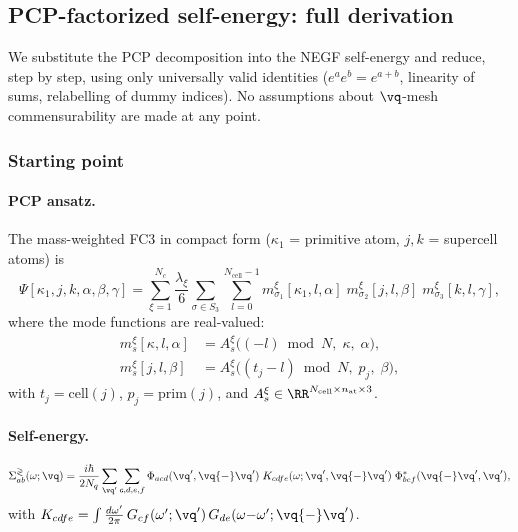 \subsection{PCP-factorized self-energy: full derivation}
\label{sub:pcp_derivation}

We substitute the PCP decomposition into the NEGF self-energy and
reduce, step by step, using only universally valid identities
($e^a e^b = e^{a+b}$, linearity of sums, relabelling of dummy
indices).  No assumptions about $\vq$-mesh commensurability are
made at any point.


\subsubsection{Starting point}

\paragraph{PCP ansatz.}
The mass-weighted FC3 in compact form
($\kappa_1$ = primitive atom, $j,k$ = supercell atoms) is
\begin{equation}\label{eq:pcp_raw}
  \Psi[\kappa_1, j, k, \alpha, \beta, \gamma]
  = \sum_{\xi=1}^{N_c} \frac{\lambda_\xi}{6}
    \sum_{\sigma \in S_3} \sum_{l=0}^{N_\mathrm{cell}-1}
    m_{\sigma_1}^{\xi}[\kappa_1, l, \alpha]\;
    m_{\sigma_2}^{\xi}[j, l, \beta]\;
    m_{\sigma_3}^{\xi}[k, l, \gamma],
\end{equation}
where the mode functions are real-valued:
\begin{align}
  m_s^{\xi}[\kappa, l, \alpha]
    &= A_s^{\xi}\bigl((-l)\bmod N,\; \kappa,\; \alpha\bigr),
  \label{eq:mode_ext}\\
  m_s^{\xi}[j, l, \beta]
    &= A_s^{\xi}\bigl((t_j - l)\bmod N,\; p_j,\; \beta\bigr),
  \label{eq:mode_int}
\end{align}
with $t_j = \mathrm{cell}(j)$, $p_j = \mathrm{prim}(j)$, and
$A_s^\xi \in \RR^{N_\mathrm{cell} \times n_\mathrm{at} \times 3}$.

\paragraph{Self-energy.}
\begin{equation}\label{eq:sigma_start}
  \Sigma^{\gtrless}_{ab}(\omega;\vq)
  = \frac{i\hbar}{2N_q} \sum_{\vq'}
    \sum_{c,d,e,f}
    \Phi_{acd}(\vq',\vq{-}\vq')\;
    K_{cdfe}(\omega;\vq',\vq{-}\vq')\;
    \Phi^*_{bef}(\vq{-}\vq',\vq'),
\end{equation}
with $K_{cdfe} = \int \frac{d\omega'}{2\pi}\,
G_{cf}(\omega';\vq')\,G_{de}(\omega{-}\omega';\vq{-}\vq')$.

